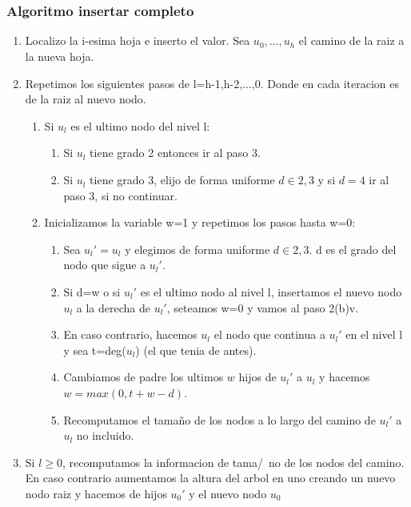\documentclass[10pt,handout]{beamer}
\begin{document}
\section{}
\begin{frame}
\frametitle{Algoritmo insertar completo}
\small
\begin{enumerate}\itemsep0em
  \item Localizo la i-esima hoja e inserto el valor. Sea $u_0,...,u_h$ el camino
    de la raiz a la nueva hoja.
  \item Repetimos los siguientes pasos de l=h-1,h-2,...,0. Donde en cada iteracion
    es de la raiz al nuevo nodo.
    \vspace{-0.05cm}
    \begin{enumerate}[a]\itemsep0em
      \item Si $u_l$ es el ultimo nodo del nivel l:
        \vspace{-0.05cm}
        \begin{enumerate}[i]\itemsep0em
          \item Si $u_l$ tiene grado 2 entonces ir al paso 3.
          \item Si $u_l$ tiene grado 3, elijo de forma uniforme $d\in{2,3}$ y si
            $d=4$ ir al paso 3, si no continuar.
        \end{enumerate}
      \item Inicializamos la variable w=1 y repetimos los pasos hasta w=0:
        \vspace{-0.05cm}
        \begin{enumerate}[i]\itemsep0em
          \item Sea $u_l'=u_l$ y elegimos de forma uniforme $d\in{2,3}$. d es el grado
            del nodo que sigue a $u_l'$.
          \item Si d=w o si $u_l'$ es el ultimo nodo al nivel l, insertamos el nuevo nodo $u_l$
            a la derecha de $u_l'$, seteamos w=0 y vamos al paso 2(b)v.
          \item En caso contrario, hacemos $u_l$ el nodo que continua a $u_l'$ en el nivel l y
            sea t=deg($u_l$) (el que tenia de antes).
          \item Cambiamos de padre los ultimos $w$ hijos de $u_l'$ a $u_l$ y hacemos $w=max(0, t+w-d)$.
          \item Recomputamos el tama\~no de los nodos a lo largo del camino de $u_l'$ a $u_l$ no incluido.
        \end{enumerate}
    \end{enumerate}
  \item Si $l\geq$0, recomputamos la informacion de tama/~no de los nodos del camino.
    En caso contrario aumentamos la altura del arbol en uno creando un nuevo nodo raiz
    y hacemos de hijos $u_0'$ y el nuevo nodo $u_0$
\end{enumerate}

\end{frame}
\end{document}
